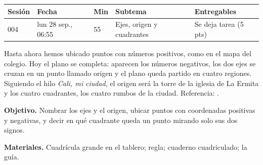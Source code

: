 \documentclass[11pt]{article}
\begin{document}
\encabezado*

\begin{center}
{\renewcommand{\arraystretch}{1.3}
\begin{tabularx}{\linewidth}{@{}l l l X l@{}}
  \toprule
  \textbf{Sesión} & \textbf{Fecha} & \textbf{Min} & \textbf{Subtema} & \textbf{Entregables}\\
  \midrule
  004 & lun 28 sep., 06:55 & 55 & Ejes, origen y cuadrantes & Se deja tarea (5 pts)\\
  \bottomrule
\end{tabularx}}
\end{center}

Hasta ahora hemos ubicado puntos con números positivos, como en el mapa del colegio. Hoy el
plano se completa: aparecen los números negativos, los dos ejes se cruzan en un punto llamado
origen y el plano queda partido en cuatro regiones. Siguiendo el hilo \emph{Cali, mi ciudad},
el origen será la torre de la iglesia de La Ermita y los cuatro cuadrantes, los cuatro rumbos
de la ciudad. Referencia: .


\textbf{Objetivo.} Nombrar los ejes y el origen, ubicar puntos con coordenadas positivas y
negativas, y decir en qué cuadrante queda un punto mirando solo sus dos signos.

\textbf{Materiales.} Cuadrícula grande en el tablero; regla; cuaderno cuadriculado; la guía.
\end{document}
